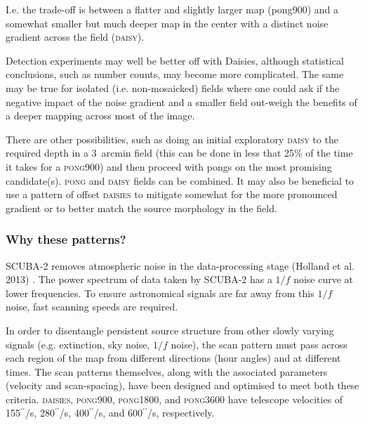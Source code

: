 \vspace{5mm}

I.e. the trade-off is between a flatter and slightly larger map (pong900) and a somewhat smaller but much deeper map in the center with a distinct noise gradient across the field (\textsc{daisy}).

\vspace{5mm}

Detection experiments may well be better off with Daisies, although statistical conclusions, such as number counts, may become more complicated. The same may be true for isolated (i.e. non-mosaicked) fields where one could ask if the negative impact of the noise gradient and a smaller field out-weigh the benefits of a deeper mapping across most of the image.

There are other possibilities, such as doing an initial exploratory \textsc{daisy} to the required depth in a 3~arcmin field (this can be done in less that 25\% of the time it takes for a \textsc{pong900}) and then proceed with pongs on the most promising candidate(s). \textsc{pong} and \textsc{daisy} fields can be combined. It may also be beneficial to use a pattern of offset \textsc{daisies} to mitigate somewhat for the more pronounced gradient or to better match the source morphology in the field.

\subsubsection*{Why these patterns?}

SCUBA-2 removes atmospheric noise in the data-processing
stage (Holland et al. 2013) \cite{s2main}. The power spectrum
of data taken by SCUBA-2 has a $1/f$ noise curve at lower frequencies. To
ensure astronomical signals are far away from this $1/f$ noise, fast
scanning speeds are required.

In order to disentangle persistent source structure from other
slowly varying signals (e.g. extinction, sky noise, $1/f$ noise), the
scan pattern must pass across each region of the map from different
directions (hour angles) and at different times. The scan patterns themselves, along
with the associated parameters (velocity and scan-spacing), have been
designed and optimised to meet both these criteria. \textsc{daisies},
\textsc{pong900}, \textsc{pong1800}, and \textsc{pong3600} have telescope
velocities of 155$^{\prime\prime}$/s, 280$^{\prime\prime}$/s, 400$^{\prime\prime}$/s,
and 600$^{\prime\prime}$/s, respectively.

